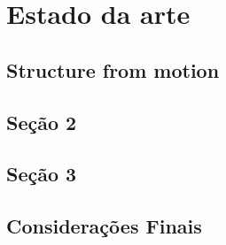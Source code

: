 \chapter{Estado da arte}

\section{Structure from motion}


\section{Seção 2}

\lipsum

\section{Seção 3}

\lipsum

\section{Considerações Finais}

\lipsum